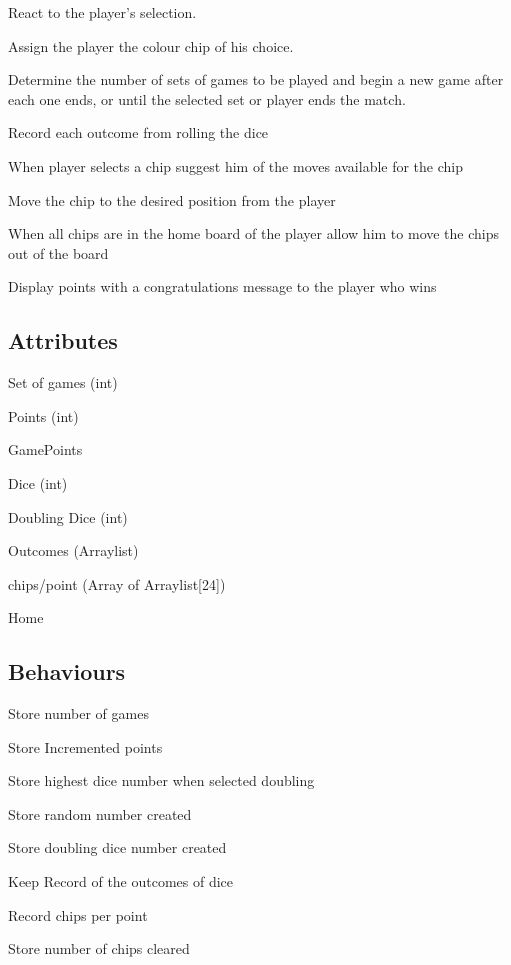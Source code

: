 \documentclass{report}
\begin{document}
\begin{dashed}
    \item React to the player's selection.
    \item Assign the player the colour chip of his choice.
    \item Determine the number of sets of games to be played and begin a new game after each one ends, or until the selected set or player ends the match.
    \item Record each outcome from rolling the dice
    \item When player selects a chip suggest him of the moves available for the chip
    \item Move the chip to the desired position from the player
    \item When all chips are in the home board of the player allow him to move the chips out of the board
    \item Display points with a congratulations message to the player who wins
\end{dashed}

\subsection{Attributes}

\begin{dashed}
    \item Set of games (int)
    \item Points (int)
    \item GamePoints
    \item Dice (int)
    \item Doubling Dice (int)
    \item Outcomes (Arraylist)
    \item chips/point (Array of Arraylist[24])
    \item Home
\end{dashed}

\subsection{Behaviours}

\begin{dashed}
    \item Store number of games
    \item Store Incremented points
    \item Store highest dice number when selected doubling
    \item Store random number created
    \item Store doubling dice number created
    \item Keep Record of the outcomes of dice
    \item Record chips per point
    \item Store number of chips cleared
\end{dashed}
\end{document}
